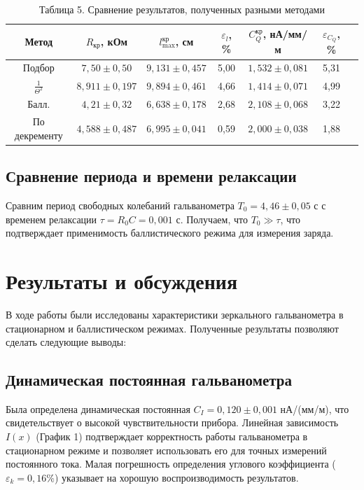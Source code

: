 \documentclass[a4paper]{article}
\begin{document}
\begin{enumerate}
\begin{table}[h!]
    \centering
    \begin{tabular}{|c|c|c|c|c|c|c|}
        \hline
        Метод & $R_{\text{кр}}$, кОм & $l_{\text{max}}^{\text{кр}}$, см & $\varepsilon_{l}$, \% & $C_Q^{\text{кр}}$, нА/мм/м & $\varepsilon_{C_Q}$, \% \\ \hline
        Подбор & $7{,}50 \pm 0{,}50$ & $9{,}131 \pm 0{,}457$ & 5,00 & $1{,}532 \pm 0{,}081$ & 5,31 \\ \hline
        $\frac{1}{\Theta^2}$ & $8{,}911 \pm 0{,}197$ & $9{,}894 \pm 0{,}461$ & 4,66 & $1{,}414 \pm 0{,}071$ & 4,99 \\ \hline
        Балл. & $4{,}21 \pm 0{,}32$ & $6{,}638 \pm 0{,}178$ & 2,68 & $2{,}108 \pm 0{,}068$ & 3,22 \\ \hline
        По декременту & $4{,}588 \pm 0{,}487$ & $6{,}995 \pm 0{,}041$ & 0,59 & $2{,}000 \pm 0{,}038$ & 1,88 \\ \hline
    \end{tabular}
    \caption{Таблица 5. Сравнение результатов, полученных разными методами}
    \label{tab:methods_comparison}
\end{table}

\subsection{Сравнение периода и времени релаксации}

Сравним период свободных колебаний гальванометра $T_0 = 4,46 \pm 0,05 \text{ с}$ с временем релаксации $\tau = R_0C = 0,001$ с. Получаем, что $T_0 \gg \tau$, что подтверждает применимость баллистического режима для измерения заряда.

\end{enumerate}

\section{Результаты и обсуждения}

В ходе работы были исследованы характеристики зеркального гальванометра в стационарном и баллистическом режимах. Полученные результаты позволяют сделать следующие выводы:

\subsection{Динамическая постоянная гальванометра}
Была определена динамическая постоянная $C_I = 0,120 \pm 0,001$ нА/(мм/м), что свидетельствует о высокой чувствительности прибора. Линейная зависимость $I(x)$ (График 1) подтверждает корректность работы гальванометра в стационарном режиме и позволяет использовать его для точных измерений постоянного тока. Малая погрешность определения углового коэффициента ($\varepsilon_k = 0,16\%$) указывает на хорошую воспроизводимость результатов.
\end{document}
